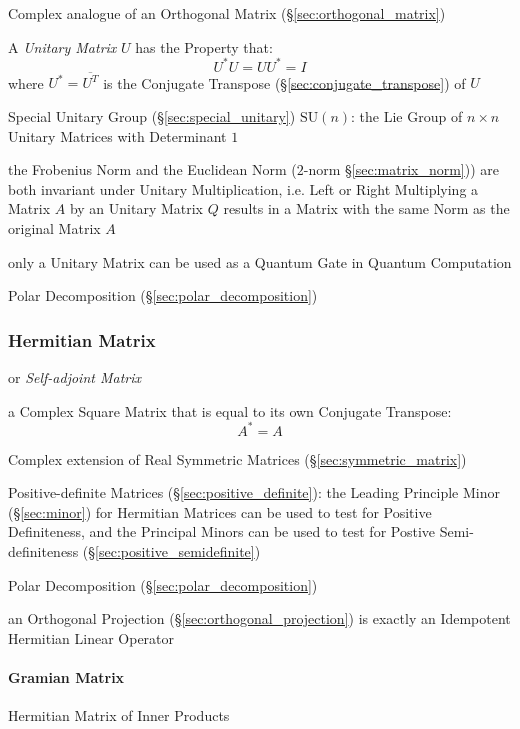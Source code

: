 Complex analogue of an Orthogonal Matrix (\S\ref{sec:orthogonal_matrix})

A \emph{Unitary Matrix} $U$ has the Property that:
\[
  U^*U = UU^* = I
\]
where $U^* = \overline{U^T}$ is the Conjugate Transpose
(\S\ref{sec:conjugate_transpose}) of $U$

\fist Special Unitary Group (\S\ref{sec:special_unitary})
$\mathrm{SU}(n)$: the Lie Group of $n \times n$ Unitary Matrices with
Determinant $1$

the Frobenius Norm and the Euclidean Norm ($2$-norm \S\ref{sec:matrix_norm}))
are both invariant under Unitary Multiplication, i.e. Left or Right Multiplying
a Matrix $A$ by an Unitary Matrix $Q$ results in a Matrix with the same Norm as
the original Matrix $A$

only a Unitary Matrix can be used as a Quantum Gate in Quantum Computation

Polar Decomposition (\S\ref{sec:polar_decomposition})



\subsubsection{Hermitian Matrix}\label{sec:hermitian_matrix}

or \emph{Self-adjoint Matrix}

a Complex Square Matrix that is equal to its own Conjugate Transpose:
\[
  A^* = A
\]

Complex extension of Real Symmetric Matrices (\S\ref{sec:symmetric_matrix})

Positive-definite Matrices (\S\ref{sec:positive_definite}): the Leading
Principle Minor (\S\ref{sec:minor}) for Hermitian Matrices can be used to test
for Positive Definiteness, and the Principal Minors can be used to test for
Postive Semi-definiteness (\S\ref{sec:positive_semidefinite})

Polar Decomposition (\S\ref{sec:polar_decomposition})

an Orthogonal Projection (\S\ref{sec:orthogonal_projection}) is exactly an
Idempotent Hermitian Linear Operator



\paragraph{Gramian Matrix}\label{sec:gramian_matrix}\hfill

Hermitian Matrix of Inner Products

